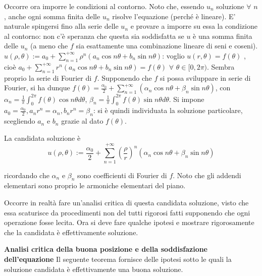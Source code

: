 \documentclass{article}
\begin{document}
Occorre ora imporre le condizioni al contorno. Noto che, essendo $u_{n}$
soluzione $\forall $ $n$, anche ogni somma finita delle $u_{n}$ risolve
l'equazione (perch\'{e} \`{e} lineare). E' naturale spingersi fino alla
serie delle $u_{n}$ e provare a imporre su essa la condizione al contorno:
non c'\`{e} speranza che questa sia soddisfatta se $u$ \`{e} una somma
finita delle $u_{n}$ (a meno che $f$ sia esattamente una combinazione
lineare di seni e coseni). $u\left( \rho ,\theta \right)
:=a_{0}+\sum_{n=1}^{+\infty }\rho ^{n}\left( a_{n}\cos n\theta +b_{n}\sin
n\theta \right) $: voglio $u\left( r,\theta \right) =f\left( \theta \right) $%
, cio\`{e} $a_{0}+\sum_{n=1}^{+\infty }r^{n}\left( a_{n}\cos n\theta
+b_{n}\sin n\theta \right) =f\left( \theta \right) $ $\forall $ $\theta \in
\lbrack 0,2\pi )$. Sembra proprio la serie di Fourier di $f$. Supponendo che 
$f$ si possa sviluppare in serie di Fourier, si ha dunque $f\left( \theta
\right) =\frac{\alpha _{0}}{2}+\sum_{n=1}^{+\infty }\left( \alpha _{n}\cos
n\theta +\beta _{n}\sin n\theta \right) $, con $\alpha _{n}=\frac{1}{\pi }%
\int_{0}^{2\pi }f\left( \theta \right) \cos n\theta d\theta $, $\beta _{n}=%
\frac{1}{\pi }\int_{0}^{2\pi }f\left( \theta \right) \sin n\theta d\theta $.
Si impone $a_{0}=\frac{\alpha _{0}}{2},a_{n}r^{n}=\alpha
_{n},b_{n}r^{n}=\beta _{n}$: si \`{e} quindi individuata la soluzione
particolare, scegliendo $a_{n}$ e $b_{n}$ grazie al dato $f\left( \theta
\right) $.

La candidata soluzione \`{e} 
\begin{equation*}
u\left( \rho ,\theta \right) :=\frac{\alpha _{0}}{2}+\sum_{n=1}^{+\infty
}\left( \frac{\rho }{r}\right) ^{n}\left( \alpha _{n}\cos n\theta +\beta
_{n}\sin n\theta \right)
\end{equation*}

ricordando che $\alpha _{n}$ e $\beta _{n}$ sono coefficienti di Fourier di $%
f$. Noto che gli addendi elementari sono proprio le armoniche elementari del
piano.

Occorre in realt\`{a} fare un'analisi critica di questa candidata soluzione,
visto che essa scaturisce da procedimenti non del tutti rigorosi fatti
supponendo che ogni operazione fosse lecita. Ora si deve fare qualche
ipotesi e mostrare rigorosamente che la candidata \`{e} effettivamente
soluzione.

\textbf{Analisi critica della buona posizione e della soddisfazione
dell'equazione} Il seguente teorema fornisce delle ipotesi sotto le quali la
soluzione candidata \`{e} effettivamente una buona soluzione.
\end{document}

